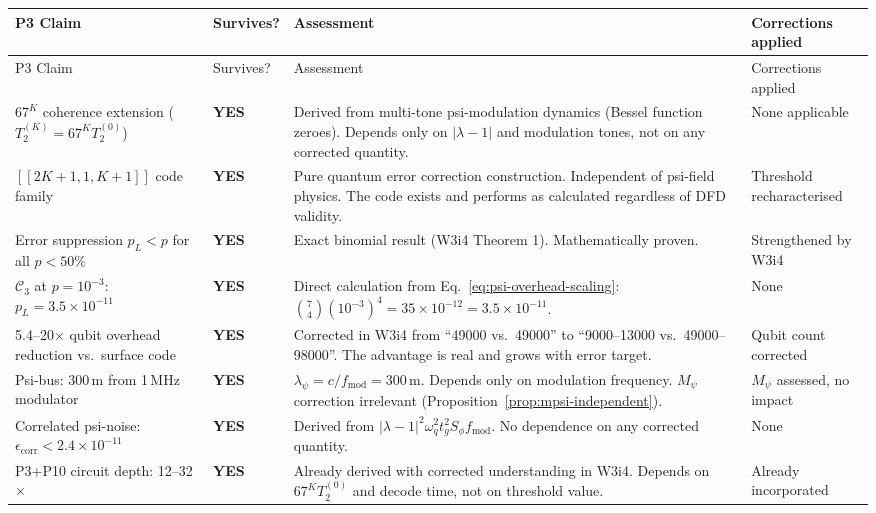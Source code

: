 \documentclass[11pt]{article}
\theoremstyle{definition}
\theoremstyle{remark}
\begin{document}
\begin{longtable}{@{}p{3.5cm}p{2cm}p{5cm}p{2.5cm}@{}}
\toprule
P3 Claim & Survives? & Assessment & Corrections applied \\
\midrule
\endfirsthead
\toprule
P3 Claim & Survives? & Assessment & Corrections applied \\
\midrule
\endhead

$67^K$ coherence extension ($T_2^{(K)} = 67^K T_2^{(0)}$) &
\textbf{YES} &
Derived from multi-tone psi-modulation dynamics (Bessel function zeroes).
Depends only on $|\lambda-1|$ and modulation tones, not on any corrected
quantity. &
None applicable \\
\midrule

$[[2K+1,1,K+1]]$ code family &
\textbf{YES} &
Pure quantum error correction construction.  Independent of psi-field
physics.  The code exists and performs as calculated regardless of
DFD validity. &
Threshold recharacterised \\
\midrule

Error suppression $p_L < p$ for all $p < 50\%$ &
\textbf{YES} &
Exact binomial result (W3i4 Theorem 1).  Mathematically proven. &
Strengthened by W3i4 \\
\midrule

$\mathcal{C}_3$ at $p = 10^{-3}$: $p_L = 3.5\times10^{-11}$ &
\textbf{YES} &
Direct calculation from Eq.~\ref{eq:psi-overhead-scaling}: $\binom{7}{4}
(10^{-3})^4 = 35\times10^{-12} = 3.5\times10^{-11}$. &
None \\
\midrule

5.4--20$\times$ qubit overhead reduction vs.\ surface code &
\textbf{YES} &
Corrected in W3i4 from ``49000 vs.\ 49000'' to ``9000--13000 vs.\ 49000--98000''. The advantage is real and grows with error target. &
Qubit count corrected \\
\midrule

Psi-bus: 300\,m from 1\,MHz modulator &
\textbf{YES} &
$\lambda_\psi = c/f_{\mathrm{mod}} = 300$\,m.  Depends only on modulation
frequency.  $M_\psi$ correction irrelevant (Proposition~\ref{prop:mpsi-independent}). &
$M_\psi$ assessed, no impact \\
\midrule

Correlated psi-noise: $\epsilon_{\mathrm{corr}} < 2.4\times10^{-11}$ &
\textbf{YES} &
Derived from $|\lambda-1|^2 \omega_q^2 t_g^2 S_\phi f_{\mathrm{mod}}$.
No dependence on any corrected quantity. &
None \\
\midrule

P3+P10 circuit depth: 12--32$\times$ &
\textbf{YES} &
Already derived with corrected understanding in W3i4.  Depends on $67^K
T_2^{(0)}$ and decode time, not on threshold value. &
Already incorporated \\
\midrule


\end{longtable}
\end{document}
